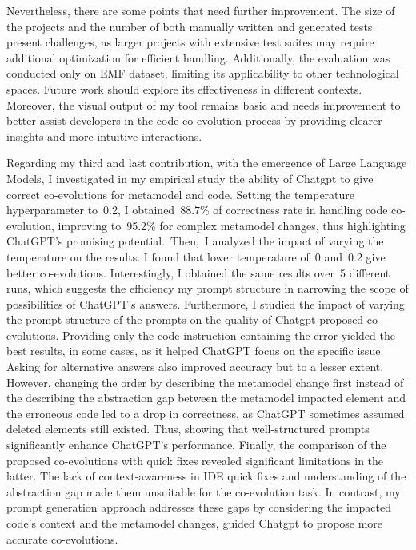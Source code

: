 Nevertheless, there are some points that need further improvement. The size of the projects and the number of both manually written and generated tests present challenges, as larger projects with extensive test suites may require additional optimization for efficient handling. Additionally, the evaluation was conducted only on EMF dataset, limiting its applicability to other technological spaces. Future work should explore its effectiveness in different contexts. Moreover, the visual output of my tool remains basic and needs improvement to better assist developers in the code co-evolution process by providing clearer insights and more intuitive interactions.

Regarding my third and last contribution, with the emergence of Large Language Models, I investigated in my empirical study the ability of Chatgpt to give correct co-evolutions for metamodel and code. Setting the temperature hyperparameter to~0.2, I obtained~88.7\% of correctness rate in handling code co-evolution, improving to~95.2\% for complex metamodel changes, thus highlighting ChatGPT’s promising potential.~Then,~I analyzed the impact of varying the temperature on the results. I found that lower temperature of~0 and~0.2 give better co-evolutions. Interestingly, I obtained the same results over~5 different runs, which suggests the efficiency my
prompt structure in narrowing the scope of possibilities of ChatGPT’s answers. Furthermore, I studied the impact of varying the prompt structure of the prompts on the quality of Chatgpt proposed co-evolutions. Providing only the code instruction containing the error yielded the best results, in some cases, as it helped ChatGPT focus on the specific issue. Asking for alternative answers also improved accuracy but to a lesser extent. However, changing the order by describing the metamodel change first instead of the describing the abstraction gap between the metamodel impacted element and the erroneous code led to a drop in correctness, as ChatGPT sometimes assumed deleted elements still existed. Thus, showing that well-structured prompts significantly enhance ChatGPT’s performance. Finally, the comparison of the proposed co-evolutions with quick fixes revealed significant limitations in the latter. The lack of context-awareness in IDE quick fixes and understanding of the abstraction gap made them unsuitable for the co-evolution task. In contrast, my prompt generation approach addresses these gaps by considering the impacted code’s context and the metamodel changes, guided Chatgpt to propose more accurate co-evolutions.

